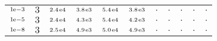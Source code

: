 \begin{tiny}
\begin{tabular}{@{$\;$}c@{$\;$}|@{$\;$}c@{$\;$}@{$\;$}c@{$\;$}@{$\;$}c@{$\;$}@{$\;$}c@{$\;$}@{$\;$}c@{$\;$}|@{$\;$}c@{$\;$}@{$\;$}c@{$\;$}@{$\;$}c@{$\;$}@{$\;$}c@{$\;$}@{$\;$}c@{$\;$}}
$\scriptstyle1\!\mathrm{\hspace{0.10em}e}-3$ & $\scriptstyle3$ & $\scriptstyle2.4\mathrm{\hspace{0.10em}e}4$ & $\scriptstyle3.8\mathrm{\hspace{0.10em}e}3$ & $\scriptstyle5.4\mathrm{\hspace{0.10em}e}4$ & $\scriptstyle3.8\mathrm{\hspace{0.10em}e}3$ & $\scriptstyle.$ & $\scriptstyle.$ & $\scriptstyle.$ & $\scriptstyle.$ & $\scriptstyle.$\\ 
$\scriptstyle1\!\mathrm{\hspace{0.10em}e}-5$ & $\scriptstyle3$ & $\scriptstyle2.4\mathrm{\hspace{0.10em}e}4$ & $\scriptstyle4.3\mathrm{\hspace{0.10em}e}3$ & $\scriptstyle5.4\mathrm{\hspace{0.10em}e}4$ & $\scriptstyle4.2\mathrm{\hspace{0.10em}e}3$ & $\scriptstyle.$ & $\scriptstyle.$ & $\scriptstyle.$ & $\scriptstyle.$ & $\scriptstyle.$\\ 
$\scriptstyle1\!\mathrm{\hspace{0.10em}e}-8$ & $\scriptstyle3$ & $\scriptstyle2.5\mathrm{\hspace{0.10em}e}4$ & $\scriptstyle4.9\mathrm{\hspace{0.10em}e}3$ & $\scriptstyle5.0\mathrm{\hspace{0.10em}e}4$ & $\scriptstyle4.9\mathrm{\hspace{0.10em}e}3$ & $\scriptstyle.$ & $\scriptstyle.$ & $\scriptstyle.$ & $\scriptstyle.$ & $\scriptstyle.$\\ 
\end{tabular} 
\end{tiny} 
